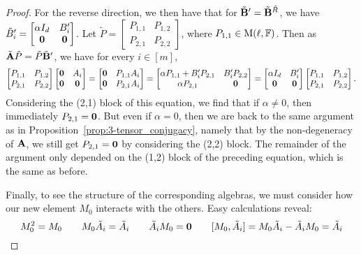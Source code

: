\documentclass[11pt]{article}
\begin{document}
\begin{proof}
For the reverse direction, we then have that for $\tilde {\mathbf{B}}' = \tilde {\mathbf{B}}^{\tilde R}$, we have $\tilde B'_i = \begin{bmatrix}\alpha I_d & B_i' \\ \mathbf{0} & \mathbf{0} \end{bmatrix}$. Let $\tilde P=\begin{bmatrix}
P_{1,1} & P_{1,2}\\
P_{2,1} & P_{2,2}
\end{bmatrix}$, where $P_{1,1}\in \mathrm{M}(\ell, \mathbb{F})$. Then as $\tilde{\mathbf{A}} 
\tilde P=\tilde P\tilde{\mathbf{B}}'$, we have for every $i\in[m]$,
\begin{equation}\label{eq:3TI_conjugacy}
\begin{bmatrix}
P_{1,1} & P_{1,2}\\
P_{2,1} & P_{2,2}
\end{bmatrix}
\begin{bmatrix}
\mathbf{0} & A_i\\
\mathbf{0} & \mathbf{0} 
\end{bmatrix}
=
\begin{bmatrix}
\mathbf{0} & P_{1,1} A_i \\
\mathbf{0} & P_{2,1} A_i
\end{bmatrix}
=
\begin{bmatrix}
\alpha P_{1,1} + B_i' P_{2,1} & B_i' P_{2,2} \\
\alpha P_{2,1} & \mathbf{0} 
\end{bmatrix}
=
\begin{bmatrix}
\alpha I_d & B_i'\\
\mathbf{0} & \mathbf{0} 
\end{bmatrix}
\begin{bmatrix}
P_{1,1} & P_{1,2}\\
P_{2,1} & P_{2,2}
\end{bmatrix}.
\end{equation} 
Considering the (2,1) block of this equation, we find that if $\alpha \neq 0$, then immediately $P_{2,1} = \mathbf{0}$. But even if $\alpha = 0$, then we are back to the same argument as in Proposition~\ref{prop:3-tensor_conjugacy}, namely that by the non-degeneracy of $\mathbf{A}$, we still get $P_{2,1} = \mathbf{0}$ by considering the (2,2) block. The remainder of the argument only depended on the (1,2) block of the preceding equation, which is the same as before.

Finally, to see the structure of the corresponding algebras, we must consider how our new element $M_0$ interacts with the others. Easy calculations reveal:
\[
M_0^2 = M_0 \qquad
M_0 \tilde A_i = \tilde A_i \qquad 
\tilde A_i M_0 = \mathbf{0} \qquad 
[M_0, \tilde A_i] = M_0 \tilde A_i - \tilde A_i M_0 = \tilde A_i
\]


\end{proof}
\end{document}
